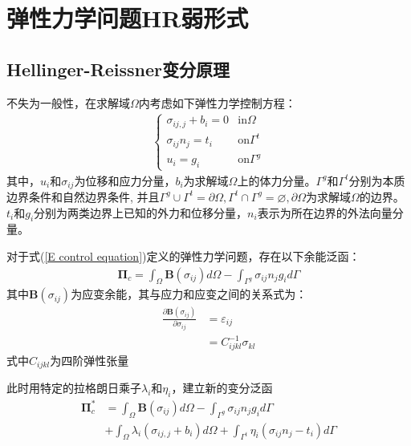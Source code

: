 \chapter{弹性力学问题HR弱形式}
\section{Hellinger-Reissner变分原理}
不失为一般性，在求解域$\Omega$内考虑如下弹性力学控制方程：
\begin{equation}\label{E control equation}
\begin{split}
\begin{cases}
    \sigma_{ij,j}+b_i=0&\text{in}\Omega\\
    \sigma_{ij}n_j=t_i&\text{on}\Gamma^t\\
    u_i=g_i&\text{on}\Gamma^g
\end{cases}
\end{split}
\end{equation}
其中，$u_i$和$\sigma_{ij}$为位移和应力分量，$b_i$为求解域$\Omega$上的体力分量。$\Gamma^g$和$\Gamma^t$分别为本质边界条件和自然边界条件,
并且$\Gamma^g\cup\Gamma^t=\partial\Omega,\Gamma^t\cap\Gamma^g=\varnothing,\partial\Omega$为求解域$\Omega$的边界。$t_i$和$g_i$分别为两类边界上已知的外力和位移分量，$n_i$表示为所在边界的外法向量分量。\par
对于式(\ref{E control equation})定义的弹性力学问题，存在以下余能泛函：
\begin{equation}
\begin{split}
    \pmb{\Pi}_c=\int_{\Omega}\pmb{B}(\sigma_{ij})d\Omega-\int_{\Gamma^g}\sigma_{ij}n_jg_id\Gamma
\end{split}
\end{equation}
其中$\pmb{B}(\sigma_{ij})$为应变余能，其与应力和应变之间的关系式为：
\begin{equation}
\begin{split}
\frac{\partial\pmb{B}(\sigma_{ij})}{\partial\sigma_{ij}}&=\varepsilon_{ij}\\
&=C^{-1}_{ijkl}\sigma_{kl}
\end{split}
\end{equation}
式中$C_{ijkl}$为四阶弹性张量\par
此时用特定的拉格朗日乘子$\lambda_i$和$\eta_i$，建立新的变分泛函
\begin{equation}\label{functional1}
\begin{split}
    \pmb{\Pi}_c^*&=\int_{\Omega}\pmb{B}(\sigma_{ij})d\Omega-\int_{\Gamma^g}\sigma_{ij}n_jg_id\Gamma\\
    &+\int_{\Omega}\lambda_i(\sigma_{ij,j}+b_i)d\Omega+\int_{\Gamma^t}\eta_i(\sigma_{ij}n_j-t_i)d\Gamma
\end{split}
\end{equation}

